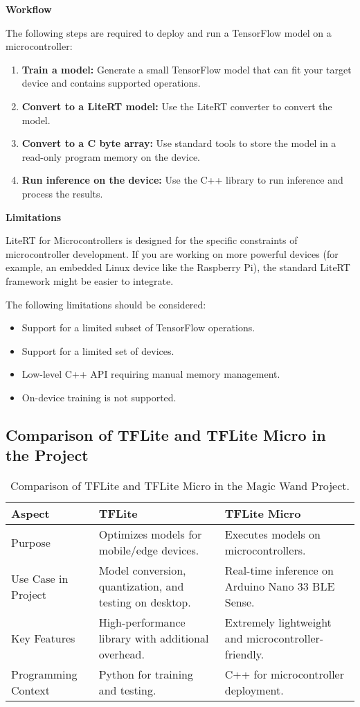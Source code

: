 \textbf{Workflow}

The following steps are required to deploy and run a TensorFlow model on a microcontroller:

\begin{enumerate}
	\item \textbf{Train a model:} Generate a small TensorFlow model that can fit your target device and contains supported operations.
	\item \textbf{Convert to a LiteRT model:} Use the LiteRT converter to convert the model.
	\item \textbf{Convert to a C byte array:} Use standard tools to store the model in a read-only program memory on the device.
	\item \textbf{Run inference on the device:} Use the C++ library to run inference and process the results.
\end{enumerate}

\textbf{Limitations}

LiteRT for Microcontrollers is designed for the specific constraints of microcontroller development. If you are working on more powerful devices (for example, an embedded Linux device like the Raspberry Pi), the standard LiteRT framework might be easier to integrate.\cite{Tensorflowlite:2024}

The following limitations should be considered:

\begin{itemize}
	\item Support for a limited subset of TensorFlow operations.
	\item Support for a limited set of devices.
	\item Low-level C++ API requiring manual memory management.
	\item On-device training is not supported.
\end{itemize}


\subsection{Comparison of TFLite and TFLite Micro in the Project}
\begin{table}[h!]
	\centering
	\begin{tabular}{|p{4cm}|p{5cm}|p{5cm}|}
		\hline
		\textbf{Aspect} & \textbf{TFLite} & \textbf{TFLite Micro} \\
		\hline
		Purpose & Optimizes models for mobile/edge devices. & Executes models on microcontrollers. \\
		\hline
		Use Case in Project & Model conversion, quantization, and testing on desktop. & Real-time inference on Arduino Nano 33 BLE Sense. \\
		\hline
		Key Features & High-performance library with additional overhead. & Extremely lightweight and microcontroller-friendly. \\
		\hline
		Programming Context & Python for training and testing. & C++ for microcontroller deployment. \\
		\hline
	\end{tabular}
	\caption{Comparison of TFLite and TFLite Micro in the Magic Wand Project.}
\end{table}



